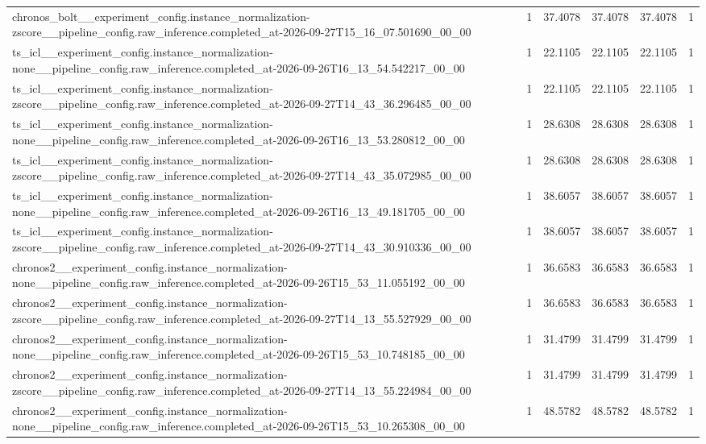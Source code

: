 \begin{tabular}{llllll}
chronos\_bolt\_\_experiment\_config.instance\_normalization-zscore\_\_pipeline\_config.raw\_inference.completed\_at-2026-09-27T15\_16\_07.501690\_00\_00 & 1 & 37.4078 & 37.4078 & 37.4078 & 1 \\
ts\_icl\_\_experiment\_config.instance\_normalization-none\_\_pipeline\_config.raw\_inference.completed\_at-2026-09-26T16\_13\_54.542217\_00\_00 & 1 & 22.1105 & 22.1105 & 22.1105 & 1 \\
ts\_icl\_\_experiment\_config.instance\_normalization-zscore\_\_pipeline\_config.raw\_inference.completed\_at-2026-09-27T14\_43\_36.296485\_00\_00 & 1 & 22.1105 & 22.1105 & 22.1105 & 1 \\
ts\_icl\_\_experiment\_config.instance\_normalization-none\_\_pipeline\_config.raw\_inference.completed\_at-2026-09-26T16\_13\_53.280812\_00\_00 & 1 & 28.6308 & 28.6308 & 28.6308 & 1 \\
ts\_icl\_\_experiment\_config.instance\_normalization-zscore\_\_pipeline\_config.raw\_inference.completed\_at-2026-09-27T14\_43\_35.072985\_00\_00 & 1 & 28.6308 & 28.6308 & 28.6308 & 1 \\
ts\_icl\_\_experiment\_config.instance\_normalization-none\_\_pipeline\_config.raw\_inference.completed\_at-2026-09-26T16\_13\_49.181705\_00\_00 & 1 & 38.6057 & 38.6057 & 38.6057 & 1 \\
ts\_icl\_\_experiment\_config.instance\_normalization-zscore\_\_pipeline\_config.raw\_inference.completed\_at-2026-09-27T14\_43\_30.910336\_00\_00 & 1 & 38.6057 & 38.6057 & 38.6057 & 1 \\
chronos2\_\_experiment\_config.instance\_normalization-none\_\_pipeline\_config.raw\_inference.completed\_at-2026-09-26T15\_53\_11.055192\_00\_00 & 1 & 36.6583 & 36.6583 & 36.6583 & 1 \\
chronos2\_\_experiment\_config.instance\_normalization-zscore\_\_pipeline\_config.raw\_inference.completed\_at-2026-09-27T14\_13\_55.527929\_00\_00 & 1 & 36.6583 & 36.6583 & 36.6583 & 1 \\
chronos2\_\_experiment\_config.instance\_normalization-none\_\_pipeline\_config.raw\_inference.completed\_at-2026-09-26T15\_53\_10.748185\_00\_00 & 1 & 31.4799 & 31.4799 & 31.4799 & 1 \\
chronos2\_\_experiment\_config.instance\_normalization-zscore\_\_pipeline\_config.raw\_inference.completed\_at-2026-09-27T14\_13\_55.224984\_00\_00 & 1 & 31.4799 & 31.4799 & 31.4799 & 1 \\
chronos2\_\_experiment\_config.instance\_normalization-none\_\_pipeline\_config.raw\_inference.completed\_at-2026-09-26T15\_53\_10.265308\_00\_00 & 1 & 48.5782 & 48.5782 & 48.5782 & 1 \\

\end{tabular}
